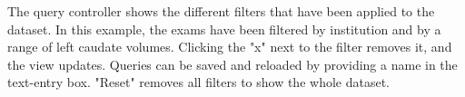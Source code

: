 \label{fig:query}
The query controller shows the different filters that have been applied to the dataset. In this example, the exams have been filtered by institution and by a range of left caudate volumes. Clicking the "x" next to the filter removes it, and the view updates. Queries can be saved and reloaded by providing a name in the text-entry box. "Reset" removes all filters to show the whole dataset.